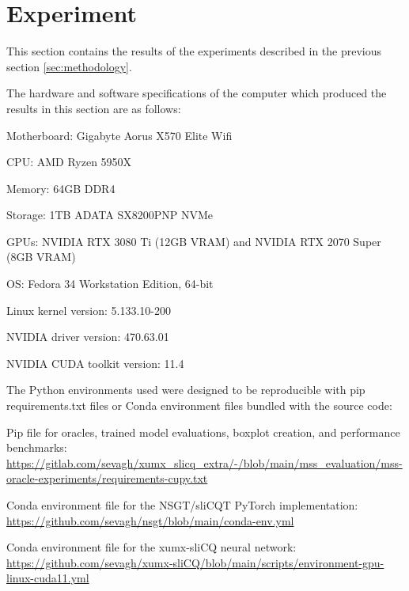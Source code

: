 \documentclass[report.tex]{subfiles}
\begin{document}
\section{Experiment}
\label{sec:experiment}

This section contains the results of the experiments described in the previous section \ref{sec:methodology}.

The hardware and software specifications of the computer which produced the results in this section are as follows:
\begin{tight_enumerate}
	\item
		Motherboard: Gigabyte Aorus X570 Elite Wifi
	\item
		CPU: AMD Ryzen 5950X
	\item
		Memory: 64GB DDR4
	\item
		Storage: 1TB ADATA SX8200PNP NVMe
	\item
		GPUs: NVIDIA RTX 3080 Ti (12GB VRAM) and NVIDIA RTX 2070 Super (8GB VRAM)
	\item
		OS: Fedora 34 Workstation Edition, 64-bit
	\item
		Linux kernel version: 5.133.10-200
	\item
		NVIDIA driver version: 470.63.01
	\item
		NVIDIA CUDA toolkit version: 11.4
\end{tight_enumerate}

The Python environments used were designed to be reproducible with pip requirements.txt files or Conda environment files bundled with the source code:

\begin{tight_enumerate}
	\item
		Pip file for oracles, trained model evaluations, boxplot creation, and performance benchmarks:\\
		\url{https://gitlab.com/sevagh/xumx_slicq_extra/-/blob/main/mss_evaluation/mss-oracle-experiments/requirements-cupy.txt}
	\item
		Conda environment file for the NSGT/sliCQT PyTorch implementation:\\
		\url{https://github.com/sevagh/nsgt/blob/main/conda-env.yml}
	\item
		Conda environment file for the xumx-sliCQ neural network:\\
		\href{https://github.com/sevagh/xumx-sliCQ/blob/main/scripts/environment-gpu-linux-cuda11.yml}{https://github.com/sevagh/xumx-sliCQ/blob/main/scripts/environment-gpu-linux-cuda11.yml}
\end{tight_enumerate}
\end{document}
